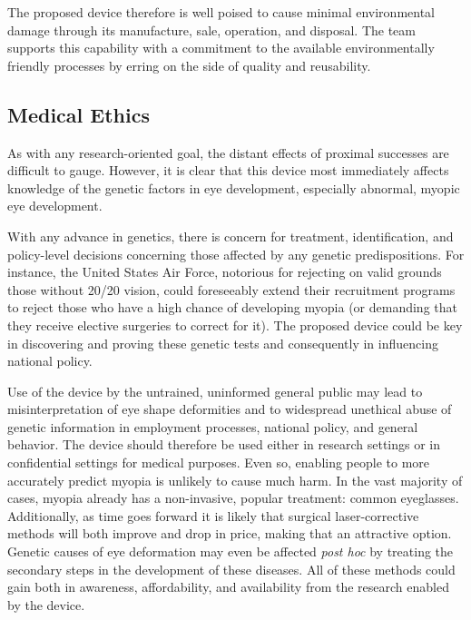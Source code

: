 \documentclass{article}
\begin{document}
 The proposed device therefore is well poised to cause minimal
environmental damage through its manufacture, sale, operation, and
disposal. The team supports this capability with a commitment to the
available environmentally friendly processes by erring on the
side of quality and reusability.
 
 
\subsection{Medical Ethics}
\label{sec:blah-blah-blah}
 

As with any research-oriented goal, the distant effects of proximal
successes are difficult to gauge. However, it is clear that this
device most immediately affects knowledge of the genetic factors in
eye development, especially abnormal, myopic eye development.

With any advance in genetics, there is concern for treatment,
identification, and policy-level decisions concerning those affected
by any genetic predispositions. For instance, the United States Air Force, notorious for rejecting on
valid grounds those without 20/20 vision, could foreseeably extend
their recruitment programs to reject those who have a high chance of
developing myopia (or demanding that they receive elective surgeries
to correct for it). The proposed device could be key in discovering
and proving these genetic tests and consequently in influencing
national policy.

Use of the device by the untrained, uninformed general public may lead to misinterpretation 
of eye shape deformities and to widespread unethical abuse of genetic information
 in employment processes, national policy, and 
general behavior. The device should therefore be used either in research settings or in confidential settings for medical purposes.  Even so, enabling people to
more accurately predict myopia is unlikely to cause much harm. 
In the vast majority of cases, myopia already has a
non-invasive, popular treatment: common eyeglasses. Additionally, as
time goes forward it is likely that surgical laser-corrective methods
will both improve and drop in price, making that an attractive
option. Genetic causes of eye deformation may even be affected
\textit{post hoc} by treating the secondary steps in the development
of these diseases. All of these methods could gain both in awareness,
affordability, and availability from the research enabled by the
device.
 
\end{document}
